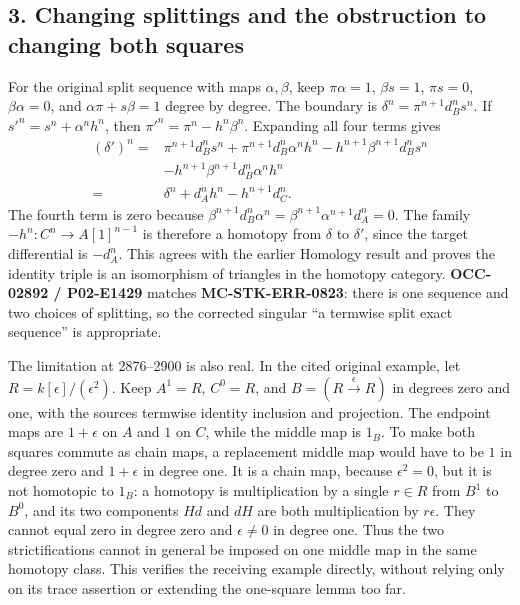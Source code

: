 \documentclass[11pt]{article}
\begin{document}
\subsection{3. Changing splittings and the obstruction to changing both squares}\label{proofs-2419-2994-changing-splittings-and-the-obstruction-to-changing-both-squares}

For the original split sequence with maps \(\alpha,\beta\),\allowbreak{} keep \(\pi\alpha=1\),\allowbreak{} \(\beta s=1\),\allowbreak{} \(\pi s=0\),\allowbreak{} \(\beta\alpha=0\),\allowbreak{} and \(\alpha\pi+s\beta=1\) degree by degree. The boundary is \(\delta^n=\pi^{n+1}d_B^ns^n\). If \(s'^n=s^n+\alpha^nh^n\),\allowbreak{} then \(\pi'^n=\pi^n-h^n\beta^n\). Expanding all four terms gives \[
\begin{split}
(\delta')^n={}&\pi^{n+1}d_B^ns^n
+\pi^{n+1}d_B^n\alpha^nh^n
-h^{n+1}\beta^{n+1}d_B^ns^n\\
&-h^{n+1}\beta^{n+1}d_B^n\alpha^nh^n\\
={}&\delta^n+d_A^nh^n-h^{n+1}d_C^n.
\end{split}
\] The fourth term is zero because \(\beta^{n+1}d_B^n\alpha^n=\beta^{n+1}\alpha^{n+1}d_A^n=0\). The family \(-h^n:C^n\to A[1]^{n-1}\) is therefore a homotopy from \(\delta\) to \(\delta'\),\allowbreak{} since the target differential is \(-d_A^n\). This agrees with the earlier Homology result and proves the identity triple is an isomorphism of triangles in the homotopy category. \textbf{OCC-02892 /\allowbreak{} P02-E1429} matches \textbf{MC-STK-ERR-0823}:\allowbreak{} there is one sequence and two choices of splitting,\allowbreak{} so the corrected singular ``a termwise split exact sequence'' is appropriate.

The limitation at 2876–\allowbreak{}2900 is also real. In the cited original example,\allowbreak{} let \(R=k[\epsilon]/(\epsilon^2)\). Keep \(A^1=R\),\allowbreak{} \(C^0=R\),\allowbreak{} and \(B=(R\xrightarrow\epsilon R)\) in degrees zero and one,\allowbreak{} with the source\textquotesingle s termwise identity inclusion and projection. The endpoint maps are \(1+\epsilon\) on \(A\) and \(1\) on \(C\),\allowbreak{} while the middle map is \(1_B\). To make both squares commute as chain maps,\allowbreak{} a replacement middle map would have to be \(1\) in degree zero and \(1+\epsilon\) in degree one. It is a chain map,\allowbreak{} because \(\epsilon^2=0\),\allowbreak{} but it is not homotopic to \(1_B\):\allowbreak{} a homotopy is multiplication by a single \(r\in R\) from \(B^1\) to \(B^0\),\allowbreak{} and its two components \(Hd\) and \(dH\) are both multiplication by \(r\epsilon\). They cannot equal zero in degree zero and \(\epsilon\ne0\) in degree one. Thus the two strictifications cannot in general be imposed on one middle map in the same homotopy class. This verifies the receiving example directly,\allowbreak{} without relying only on its trace assertion or extending the one-square lemma too far.
\end{document}
